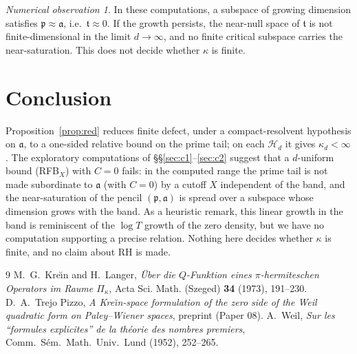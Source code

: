 \documentclass[11pt]{amsart}
\theoremstyle{definition}
\theoremstyle{remark}
\newtheorem{observation}[theorem]{Numerical observation}
\newcommand{\fa}{\mathfrak a}
\newcommand{\fp}{\mathfrak p}
\newcommand{\ft}{\mathfrak t}
\begin{document}
\begin{observation}\label{cor:c2}
In these computations, a subspace of growing dimension satisfies
$\fp\approx\fa$, i.e.\ $\ft\approx0$. If the growth persists, the near-null
space of $\ft$ is not finite-dimensional in the limit $d\to\infty$, and no
finite critical subspace carries the near-saturation. This does not decide
whether $\kappa$ is finite.
\end{observation}

\section{Conclusion}
Proposition~\ref{prop:red} reduces finite defect, under a compact-resolvent
hypothesis on $\fa$, to a one-sided relative bound on the prime tail; on each
$\mathcal H_d$ it gives $\kappa_d<\infty$. The exploratory computations of
\S\S\ref{sec:c1}--\ref{sec:c2} suggest that a $d$-uniform bound (RFB$_X$)
with $C=0$ fails: in the computed range the prime tail is not made subordinate
to $\fa$ (with $C=0$) by a cutoff $X$ independent of the band, and the
near-saturation
of the pencil $(\fp,\fa)$ is spread over a subspace whose dimension grows with
the band. As a heuristic remark, this linear growth in the band is reminiscent
of the $\log T$ growth of the zero density, but we have no computation
supporting a precise relation. Nothing here decides whether $\kappa$ is finite,
and no claim about RH is made.

\begin{thebibliography}{9}
 M.~G.~Kre\u\i n and H.~Langer, \emph{\"Uber die
$Q$-Funktion eines $\pi$-hermiteschen Operators im Raume $\Pi_\kappa$}, Acta
Sci. Math. (Szeged) \textbf{34} (1973), 191--230.
 D.~A.~Trejo Pizzo, \emph{A Kre\u\i n-space formulation of the zero
side of the Weil quadratic form on Paley--Wiener spaces}, preprint (Paper 08).
 A.~Weil, \emph{Sur les ``formules explicites'' de la th\'eorie
des nombres premiers}, Comm.\ S\'em.\ Math.\ Univ.\ Lund (1952), 252--265.
\end{thebibliography}
\end{document}
